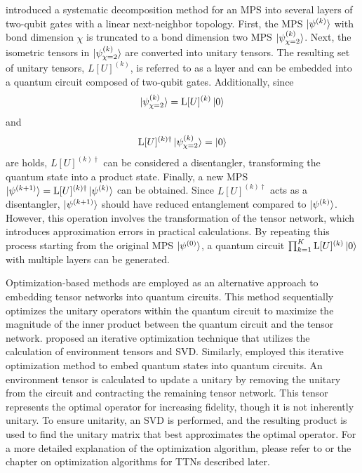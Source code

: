 \documentclass[12pt,dvipdfmx,twoside,openright]{report}
\begin{document}
\cite{EncodingMPS} introduced a systematic decomposition method for an MPS into several layers of two-qubit gates with a linear next-neighbor topology. 
First, the MPS $\ket{\psi^{(k)}}$ with bond dimension $\chi$ is truncated to a bond dimension two MPS $\ket{\psi_{\chi=2}^{(k)}}$.
Next, the isometric tensors in $\ket{\psi_{\chi=2}^{(k)}}$ are converted into unitary tensors.
The resulting set of unitary tensors, $L[U]^{(k)}$, is referred to as a layer and can be embedded into a quantum circuit composed of two-qubit gates.
Additionally, since
\begin{equation}
    \ket{\psi_{\chi=2}^{(k)}}=\mathrm{L}[U]^{(k)}\ket{0}
\end{equation}
and
\begin{equation}
    \mathrm{L}[U]^{(k)\dagger}\ket{\psi_{\chi=2}^{(k)}}=\ket{0}
\end{equation}
are holds, $L[U]^{(k)\dagger}$ can be considered a disentangler, transforming the quantum state into a product state.
Finally, a new MPS $\ket{\psi^{(k+1)}}=\mathrm{L}[U]^{(k)\dagger}\ket{\psi^{(k)}}$ can be obtained.
Since $L[U]^{(k)\dagger}$ acts as a disentangler, $\ket{\psi^{(k+1)}}$ should have reduced entanglement compared to $\ket{\psi^{(k)}}$.
However, this operation involves the transformation of the tensor network, which introduces approximation errors in practical calculations.
By repeating this process starting from the original MPS $\ket{\psi^{(0)}}$, a quantum circuit $\prod_{k=1}^K \mathrm{L}[U]^{(k)}\ket{0}$ with multiple layers can be generated.
 
Optimization-based methods are employed as an alternative approach to embedding tensor networks into quantum circuits.
This method sequentially optimizes the unitary operators within the quantum circuit to maximize the magnitude of the inner product between the quantum circuit and the tensor network.
\cite{env-tensor} proposed an iterative optimization technique that utilizes the calculation of environment tensors and SVD.
Similarly, \cite{mpsoptim} employed this iterative optimization method to embed quantum states into quantum circuits.
An environment tensor is calculated to update a unitary by removing the unitary from the circuit and contracting the remaining tensor network.
This tensor represents the optimal operator for increasing fidelity, though it is not inherently unitary.
To ensure unitarity, an SVD is performed, and the resulting product is used to find the unitary matrix that best approximates the optimal operator.
For a more detailed explanation of the optimization algorithm, please refer to \cite{mpsdecomp} or the chapter on optimization algorithms for TTNs described later.
\end{document}
